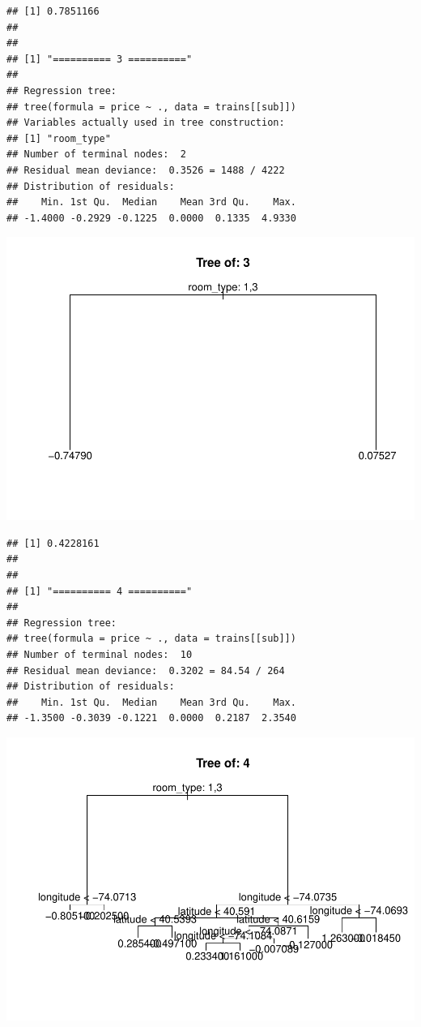 \documentclass[
]{article}
\begin{document}
\begin{verbatim}
## [1] 0.7851166
## 
## 
## [1] "========== 3 =========="
## 
## Regression tree:
## tree(formula = price ~ ., data = trains[[sub]])
## Variables actually used in tree construction:
## [1] "room_type"
## Number of terminal nodes:  2 
## Residual mean deviance:  0.3526 = 1488 / 4222 
## Distribution of residuals:
##    Min. 1st Qu.  Median    Mean 3rd Qu.    Max. 
## -1.4000 -0.2929 -0.1225  0.0000  0.1335  4.9330
\end{verbatim}

\includegraphics{project-code_files/figure-latex/unnamed-chunk-14-3.pdf}

\begin{verbatim}
## [1] 0.4228161
## 
## 
## [1] "========== 4 =========="
## 
## Regression tree:
## tree(formula = price ~ ., data = trains[[sub]])
## Number of terminal nodes:  10 
## Residual mean deviance:  0.3202 = 84.54 / 264 
## Distribution of residuals:
##    Min. 1st Qu.  Median    Mean 3rd Qu.    Max. 
## -1.3500 -0.3039 -0.1221  0.0000  0.2187  2.3540
\end{verbatim}

\includegraphics{project-code_files/figure-latex/unnamed-chunk-14-4.pdf}
\end{document}
